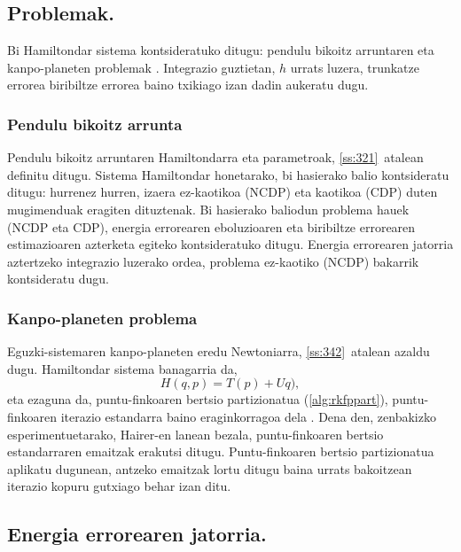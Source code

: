 \subsection{Problemak.}

Bi Hamiltondar sistema kontsideratuko ditugu: pendulu bikoitz arruntaren eta kanpo-planeten problemak \cite{Hairer2006} \cite{Dumitru}. Integrazio guztietan, $h$ urrats luzera, trunkatze errorea biribiltze errorea baino txikiago izan dadin aukeratu dugu.

\subsubsection*{Pendulu bikoitz arrunta}
Pendulu bikoitz arruntaren Hamiltondarra eta parametroak, \ref{ss:321}~atalean definitu ditugu. Sistema Hamiltondar honetarako, bi hasierako balio kontsideratu ditugu: hurrenez hurren, izaera ez-kaotikoa (NCDP) eta kaotikoa (CDP) duten mugimenduak eragiten dituztenak. Bi hasierako baliodun problema hauek (NCDP eta CDP), energia errorearen eboluzioaren eta biribiltze errorearen estimazioaren azterketa egiteko kontsideratuko ditugu. Energia errorearen jatorria aztertzeko integrazio luzerako ordea, problema ez-kaotiko (NCDP) bakarrik kontsideratu dugu.       

\subsubsection*{Kanpo-planeten problema}
Eguzki-sistemaren kanpo-planeten eredu Newtoniarra, \ref{ss:342}~atalean azaldu dugu. Hamiltondar sistema banagarria da,
\begin{equation*}
H(q,p)= T(p)+Uq),
\end{equation*}
eta ezaguna da, puntu-finkoaren bertsio partizionatua (\ref{alg:rkfppart}), puntu-finkoaren iterazio estandarra baino eraginkorragoa dela  \cite{Sanz-Serna1992}. Dena den, zenbakizko esperimentuetarako, Hairer-en \cite{Hairer2008} lanean bezala, puntu-finkoaren bertsio estandarraren emaitzak erakutsi ditugu. Puntu-finkoaren bertsio partizionatua aplikatu dugunean, antzeko emaitzak lortu ditugu baina urrats bakoitzean iterazio kopuru gutxiago behar izan ditu.  


\subsection{Energia errorearen jatorria.}

